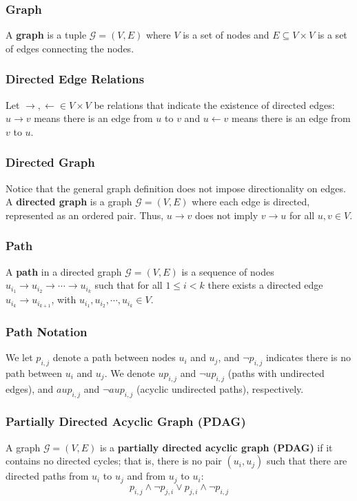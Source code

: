 \documentclass{article}
\begin{document}
	\subsubsection*{Graph}
	A \textbf{graph} is a tuple $\mathcal{G} = (V, E)$ where $V$ is a set of nodes and $E \subseteq V \times V$ is a set of edges connecting the nodes.
	
	\subsubsection*{Directed Edge Relations}
	Let $\rightarrow, \leftarrow \in V \times V$ be relations that indicate the existence of directed edges: $u \rightarrow v$ means there is an edge from $u$ to $v$ and $u \leftarrow v$ means there is an edge from $v$ to $u$.
	
	\subsubsection*{Directed Graph}
	Notice that the general graph definition does not impose directionality on edges. A \textbf{directed graph} is a graph $\mathcal{G} = (V, E)$ where each edge is directed, represented as an ordered pair. Thus, $u \to v$ does not imply $v \to u$ for all $u,v \in V$.
	
	\subsubsection*{Path}
	A \textbf{path} in a directed graph $\mathcal{G} = (V, E)$ is a sequence of nodes $u_{i_1} \rightarrow u_{i_2} \rightarrow \cdots \rightarrow u_{i_k}$ such that for all $1 \leq i < k$ there exists a directed edge $u_{i_k} \rightarrow u_{i_{k + 1}}$, with $u_{i_1}, u_{i_2}, \cdots, u_{i_k} \in V$.
	
	\subsubsection*{Path Notation}
	We let $p_{i,j}$ denote a path between nodes $u_i$ and $u_j$, and $\neg p_{i,j}$ indicates there is no path between $u_i$ and $u_j$. We denote $up_{i,j}$ and $\neg up_{i,j}$ (paths with undirected edges), and $aup_{i,j}$ and $\neg aup_{i,j}$ (acyclic undirected paths), respectively.
	
	\subsubsection*{Partially Directed Acyclic Graph (PDAG)}
	A graph $\mathcal{G} = (V, E)$ is a \textbf{partially directed acyclic graph (PDAG)} if it contains no directed cycles; that is, there is no pair $(u_i, u_j)$ such that there are directed paths from $u_i$ to $u_j$ and from $u_j$ to $u_i$:
	\[
	p_{i,j} \land \neg p_{j,i} \lor p_{j,i} \land \neg p_{i,j}
	\]
	
\end{document}
